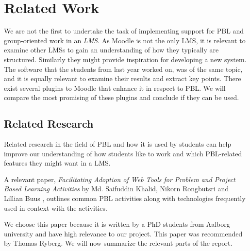 \chapter{Related Work}
We are not the first to undertake the task of implementing support for PBL and group-oriented work in an \textit{LMS}. 
As Moodle is not the only LMS, it is relevant to examine other LMSs to gain an understanding of how they typically are structured. 
Similarly they might provide inspiration for developing a new system.
The software that the students from last year worked on, was of the same topic, and it is equally relevant to examine their results and extract key points.
There exist several plugins to Moodle that enhance it in respect to PBL. 
We will compare the most promising of these plugins and conclude if they can be used.

\section{Related Research}
\label{sec:research}
Related research in the field of PBL and how it is used by students can help improve our understanding of how students like to work and which PBL-related features they might want in a LMS.
 
A relevant paper, \textit{Facilitating Adoption of Web Tools for Problem and Project Based Learning Activities} by Md. Saifuddin Khalid, Nikorn Rongbutsri and Lillian Buus \citep{khalidRongbutsriBuus}, outlines common PBL activities along with technologies frequently used in context with the activities.

We choose this paper because it is written by a PhD students from Aalborg university and have high relevance to our project. This paper was recommended by Thomas Ryberg\cite{thomas}. We will now summarize the relevant parts of the report.  

